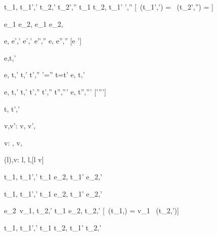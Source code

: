   { {t_1,{\sigma}  {\stride }{t_1}',{\sigma}'}\Quad
   { t_2,{\sigma' }{\stride} {t_2}',{\sigma}''}}
  {t_1 \Or t_2,{\sigma} {\stride} {t_1}' ',{\sigma}''}
  [\Value\ ({t_1}',{\sigma}') = \bot \land \Value\ ({t_2}',{\sigma}'') = \bot ]


  { }
  {e_1 \Xor e_2,{\sigma} {\stride} e_1 \Xor e_2,{\sigma}}

    {e,{\sigma} {\eval} {e}',{\sigma}'  \Quad
     e',{\sigma}' {\stride} {e}'',{\sigma}''}
    {e,{\sigma} {\stride} {e}'',{\sigma}''}
    [e ']



  {e,\sigma \normalise t,\sigma'}


    { {e,{\sigma} {\eval} {t},{\sigma}'}\Quad
     { {t,\sigma' \stride t',\sigma''}\Quad
     {\sigma'=\sigma'' \land t=t'}}}
    {e,{\sigma} {\normalise} {t},{\sigma}'}

    { e,{\sigma} {\eval} {t},{\sigma}'\Quad
      t,\sigma' \stride t',{\sigma}''\Quad
      t',\sigma'' \normalise t'',\sigma'''}
    {e,{\sigma} {\normalise} {t}'',{\sigma}'''}
    [{\sigma}'\neq {\sigma}''']



  {t,\sigma {} t',\sigma'}


  {v,v':\beta}
  {\Edit v,{\sigma}  \Edit v',{\sigma}}

  { v:\beta}
  {\Enter \beta,{\sigma}  \Edit v,{\sigma}}

  {\sigma(l),v:\beta }
  {\Update l,{\sigma}  \Update l,{\sigma}[l \mapsto v]}

  {t_1,\sigma {} {t_1'},\sigma'}
  {t_1 \Then e_2,\sigma {} {t_1'} \Then e_2,\sigma'}

  {t_1,\sigma {} {t_1'},\sigma'}
  {t_1 \Next e_2,\sigma {} {t_1'} \Next e_2,\sigma'}

  { {e_2\ {v_1},\sigma {\normalise} {t_2},{\sigma}'}}
  {t_1 \Next e_2,\sigma \xrightarrow[]{\Continue} {t_2},{\sigma}'}
  [\Value\ {(t_1,\sigma)} = {v_1} \land \neg\Failing\ ({t_2},{\sigma}')]

  {t_1,\sigma {} {t_1}',{\sigma}'}
  {t_1 \And t_2,\sigma {} {t_1}' \And t_2,{\sigma}'}

